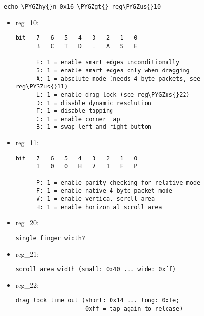 \documentclass[a4paper,8pt,english]{sphinxmanual}
\def\PYGZus{\char`\_}
\def\PYGZgt{\char`\>}
\def\PYGZhy{\char`\-}
\begin{document}
\begin{Verbatim}[commandchars=\\\{\}]
echo \PYGZhy{}n 0x16 \PYGZgt{} reg\PYGZus{}10
\end{Verbatim}
\begin{itemize}
\item {} 
reg\_10:

\begin{Verbatim}[commandchars=\\\{\}]
bit   7   6   5   4   3   2   1   0
      B   C   T   D   L   A   S   E

      E: 1 = enable smart edges unconditionally
      S: 1 = enable smart edges only when dragging
      A: 1 = absolute mode (needs 4 byte packets, see reg\PYGZus{}11)
      L: 1 = enable drag lock (see reg\PYGZus{}22)
      D: 1 = disable dynamic resolution
      T: 1 = disable tapping
      C: 1 = enable corner tap
      B: 1 = swap left and right button
\end{Verbatim}

\item {} 
reg\_11:

\begin{Verbatim}[commandchars=\\\{\}]
bit   7   6   5   4   3   2   1   0
      1   0   0   H   V   1   F   P

      P: 1 = enable parity checking for relative mode
      F: 1 = enable native 4 byte packet mode
      V: 1 = enable vertical scroll area
      H: 1 = enable horizontal scroll area
\end{Verbatim}

\item {} 
reg\_20:

\begin{Verbatim}[commandchars=\\\{\}]
single finger width?
\end{Verbatim}

\item {} 
reg\_21:

\begin{Verbatim}[commandchars=\\\{\}]
scroll area width (small: 0x40 ... wide: 0xff)
\end{Verbatim}

\item {} 
reg\_22:

\begin{Verbatim}[commandchars=\\\{\}]
drag lock time out (short: 0x14 ... long: 0xfe;
                    0xff = tap again to release)
\end{Verbatim}


\end{itemize}
\end{document}
